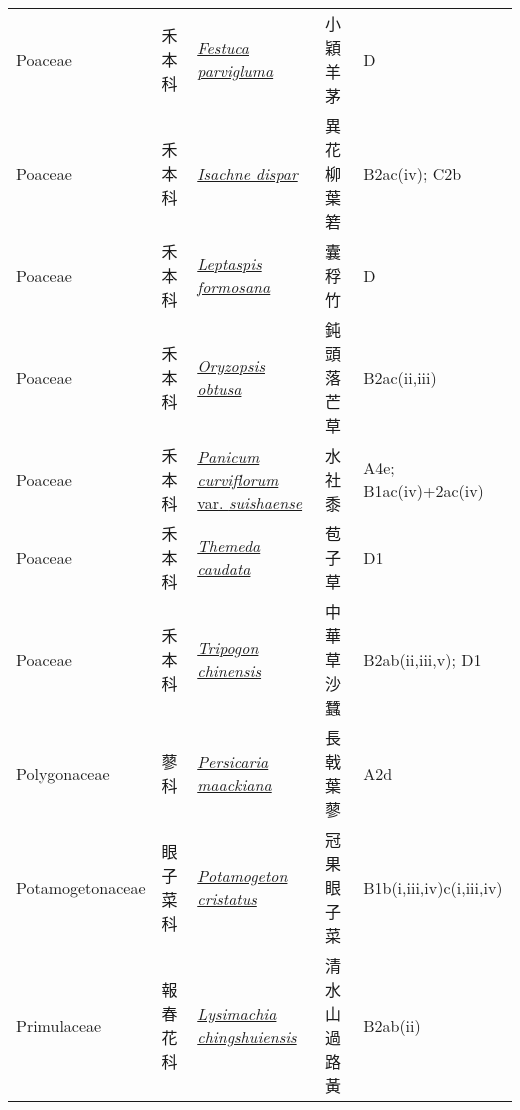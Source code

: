 {\begin{longtable}{p{2.5cm}p{2cm}p{5cm}p{2.5cm}p{3cm}}
    Poaceae & 禾本科 & \href{http://www.theplantlist.org/tpl1.1/search?q=Festuca+parvigluma}{\textit{Festuca parvigluma} } & 小穎羊茅 & D \index{Festuca@\textit{Festuca}!parvigluma@\textit{parvigluma}}  \index{小穎羊茅} \\
    Poaceae & 禾本科 & \href{http://www.theplantlist.org/tpl1.1/search?q=Isachne+dispar}{\textit{Isachne dispar} } & 異花柳葉箬 & B2ac(iv); C2b \index{Isachne@\textit{Isachne}!dispar@\textit{dispar}}  \index{異花柳葉箬} \\
    Poaceae & 禾本科 & \href{http://www.theplantlist.org/tpl1.1/search?q=Leptaspis+formosana}{\textit{Leptaspis formosana} } & 囊稃竹 & D \index{Leptaspis@\textit{Leptaspis}!formosana@\textit{formosana}}  \index{囊稃竹} \\
    Poaceae & 禾本科 & \href{http://www.theplantlist.org/tpl1.1/search?q=Oryzopsis+obtusa}{\textit{Oryzopsis obtusa} } & 鈍頭落芒草 & B2ac(ii,iii) \index{Oryzopsis@\textit{Oryzopsis}!obtusa@\textit{obtusa}}  \index{鈍頭落芒草} \\
    Poaceae & 禾本科 & \href{http://www.theplantlist.org/tpl1.1/search?q=Panicum+curviflorum+var.+suishaense}{\textit{Panicum curviflorum} var. \textit{suishaense} } & 水社黍 & A4e; B1ac(iv)+2ac(iv) \index{Panicum@\textit{Panicum}!curviflorum@\textit{curviflorum}!var. suishaense@var. \textit{suishaense}}  \index{水社黍} \\
    Poaceae & 禾本科 & \href{http://www.theplantlist.org/tpl1.1/search?q=Themeda+caudata}{\textit{Themeda caudata} } & 苞子草 & D1 \index{Themeda@\textit{Themeda}!caudata@\textit{caudata}}  \index{苞子草} \\
    Poaceae & 禾本科 & \href{http://www.theplantlist.org/tpl1.1/search?q=Tripogon+chinensis}{\textit{Tripogon chinensis} } & 中華草沙蠶 & B2ab(ii,iii,v); D1 \index{Tripogon@\textit{Tripogon}!chinensis@\textit{chinensis}}  \index{中華草沙蠶} \\
    Polygonaceae & 蓼科 & \href{http://www.theplantlist.org/tpl1.1/search?q=Persicaria+maackiana}{\textit{Persicaria maackiana} } & 長戟葉蓼 & A2d \index{Persicaria@\textit{Persicaria}!maackiana@\textit{maackiana}}  \index{長戟葉蓼} \\
    Potamogetonaceae & 眼子菜科 & \href{http://www.theplantlist.org/tpl1.1/search?q=Potamogeton+cristatus}{\textit{Potamogeton cristatus} } & 冠果眼子菜 & B1b(i,iii,iv)c(i,iii,iv) \index{Potamogeton@\textit{Potamogeton}!cristatus@\textit{cristatus}}  \index{冠果眼子菜} \\
    Primulaceae & 報春花科 & \href{http://www.theplantlist.org/tpl1.1/search?q=Lysimachia+chingshuiensis}{\textit{Lysimachia chingshuiensis} } & 清水山過路黃 & B2ab(ii) \index{Lysimachia@\textit{Lysimachia}!chingshuiensis@\textit{chingshuiensis}}  \index{清水山過路黃} \\

\end{longtable}}
